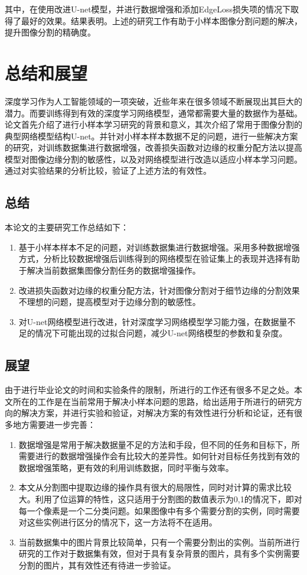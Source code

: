 \documentclass[AutoFakeBold]{LZUThesis}
\begin{document}
其中，在使用改进U-net模型，并进行数据增强和添加EdgeLoss损失项的情况下取得了最好的效果。结果表明。上述的研究工作有助于小样本图像分割问题的解决，提升图像分割的精确度。




\chapter{总结和展望}
深度学习作为人工智能领域的一项突破，近些年来在很多领域不断展现出其巨大的潜力。而要训练得到有效的深度学习网络模型，通常都需要大量的数据作为基础。论文首先介绍了进行小样本学习研究的背景和意义，其次介绍了常用于图像分割的典型网络模型结构U-net。并针对小样本样本数据不足的问题，进行一些解决方案的研究，对训练数据集进行数据增强，改善损失函数对边缘的权重分配方法以提高模型对图像边缘分割的敏感性，以及对网络模型进行改造以适应小样本学习问题。通过对实验结果的分析比较，验证了上述方法的有效性。
\section{总结}
本论文的主要研究工作总结如下：
\begin{enumerate}
    \item 基于小样本样本不足的问题，对训练数据集进行数据增强。采用多种数据增强方式，分析比较数据增强后训练得到的网络模型在验证集上的表现并选择有助于解决当前数据集图像分割任务的数据增强操作。
    \item 改进损失函数对边缘的权重分配方法，针对图像分割对于细节边缘的分割效果不理想的问题，提高模型对于边缘分割的敏感性。
    \item 对U-net网络模型进行改进，针对深度学习网络模型学习能力强，在数据量不足的情况下可能出现的过拟合问题，减少U-net网络模型的参数和复杂度。
\end{enumerate}

\section{展望}
由于进行毕业论文的时间和实验条件的限制，所进行的工作还有很多不足之处。本文所在的工作是在当前常用于解决小样本问题的思路，给出适用于所进行的研究方向的解决方案，并进行实验和验证，对解决方案的有效性进行分析和论证，还有很多地方需要进一步完善：
\begin{enumerate}
    \item 数据增强是常用于解决数据量不足的方法和手段，但不同的任务和目标下，所需要进行的数据增强操作会有比较大的差异性。如何针对目标任务找到有效的数据增强策略，更有效的利用训练数据，同时平衡与效率。
    \item 本文从分割图中提取边缘的操作具有很大的局限性，同时对计算的需求比较大。利用了位运算的特性，这只适用于分割图的数值表示为0,1的情况下，即对每一个像素是一个二分类问题。如果图像中有多个需要分割的实例，同时需要对这些实例进行区分的情况下，这一方法将不在适用。
    \item 当前数据集中的图片背景比较简单，只有一个需要分割出的实例。当前所进行研究的工作对于数据集有效，但对于具有复杂背景的图片，具有多个实例需要分割的图片，其有效性还有待进一步验证。
\end{enumerate}
\end{document}
